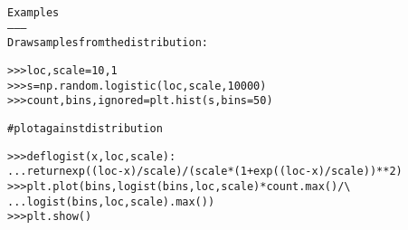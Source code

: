 \begin{boxedminipage}{\funcwidth}
\begin{alltt}
Examples
--------
Draw samples from the distribution:

{\textgreater}{\textgreater}{\textgreater} loc, scale = 10, 1
{\textgreater}{\textgreater}{\textgreater} s = np.random.logistic(loc, scale, 10000)
{\textgreater}{\textgreater}{\textgreater} count, bins, ignored = plt.hist(s, bins=50)

\#   plot against distribution

{\textgreater}{\textgreater}{\textgreater} def logist(x, loc, scale):
...     return exp((loc-x)/scale)/(scale*(1+exp((loc-x)/scale))**2)
{\textgreater}{\textgreater}{\textgreater} plt.plot(bins, logist(bins, loc, scale)*count.max()/{\textbackslash}
... logist(bins, loc, scale).max())
{\textgreater}{\textgreater}{\textgreater} plt.show()
\end{alltt}

\setlength{\parskip}{1ex}
    \end{boxedminipage}

    \label{QSTK:qstklearn:mldiagnostics:lognormal}

    \vspace{0.5ex}

